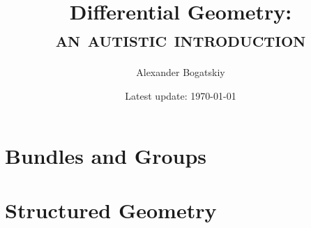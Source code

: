 \documentclass[english,a5paper]{book}%
\begin{document}
\title{
    {\Large{}Differential Geometry:}\\
    \textsc{an autistic introduction}
    }
\author{Alexander Bogatskiy}
\date{Latest update: \today}

\maketitle

\tableofcontents{}

\clearpage
\printglossary[type=\acronymtype,title=Abbreviations,style=long,nonumberlist] %



% 

% 


\clearpage
\part{Bundles and Groups}



\clearpage
\part{Structured Geometry}\label{Part Structured Geom}




% 



% 


% 
\end{document}
